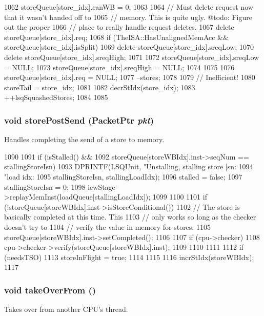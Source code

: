 \begin{DoxyCode}
{{1062         storeQueue[store_idx].canWB = 0;
1063 
1064         // Must delete request now that it wasn't handed off to
1065         // memory.  This is quite ugly.  @todo: Figure out the proper
1066         // place to really handle request deletes.
1067         delete storeQueue[store_idx].req;
1068         if (TheISA::HasUnalignedMemAcc && storeQueue[store_idx].isSplit) {
1069             delete storeQueue[store_idx].sreqLow;
1070             delete storeQueue[store_idx].sreqHigh;
1071 
1072             storeQueue[store_idx].sreqLow = NULL;
1073             storeQueue[store_idx].sreqHigh = NULL;
1074         }
1075 
1076         storeQueue[store_idx].req = NULL;
1077         --stores;
1078 
1079         // Inefficient!
1080         storeTail = store_idx;
1081 
1082         decrStIdx(store_idx);
1083         ++lsqSquashedStores;
1084     }
1085 }
\end{DoxyCode}
\hypertarget{classLSQUnit_a6f23a0d213e7d35f445f9cabfd2ed0cc}{
\subsubsection[{storePostSend}]{\setlength{\rightskip}{0pt plus 5cm}void storePostSend ({\bf PacketPtr} {\em pkt})}}
\label{classLSQUnit_a6f23a0d213e7d35f445f9cabfd2ed0cc}
Handles completing the send of a store to memory. 


\begin{DoxyCode}
1090 {
1091     if (isStalled() &&
1092         storeQueue[storeWBIdx].inst->seqNum == stallingStoreIsn) {
1093         DPRINTF(LSQUnit, "Unstalling, stalling store [sn:%
1094                 "load idx:%
1095                 stallingStoreIsn, stallingLoadIdx);
1096         stalled = false;
1097         stallingStoreIsn = 0;
1098         iewStage->replayMemInst(loadQueue[stallingLoadIdx]);
1099     }
1100 
1101     if (!storeQueue[storeWBIdx].inst->isStoreConditional()) {
1102         // The store is basically completed at this time. This
1103         // only works so long as the checker doesn't try to
1104         // verify the value in memory for stores.
1105         storeQueue[storeWBIdx].inst->setCompleted();
1106 
1107         if (cpu->checker) {
1108             cpu->checker->verify(storeQueue[storeWBIdx].inst);
1109         }
1110     }
1111 
1112     if (needsTSO) {
1113         storeInFlight = true;
1114     }
1115 
1116     incrStIdx(storeWBIdx);
1117 }
\end{DoxyCode}
\hypertarget{classLSQUnit_a8674059ce345e23aac5086b2c3e24a43}{
\subsubsection[{takeOverFrom}]{\setlength{\rightskip}{0pt plus 5cm}void takeOverFrom ()}}
\label{classLSQUnit_a8674059ce345e23aac5086b2c3e24a43}
Takes over from another CPU's thread. 


